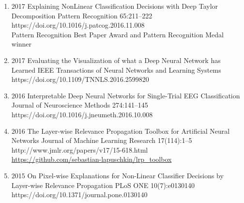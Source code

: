 {\begin{enumerate}
    \item {}
                            {2017}
                            {Explaining NonLinear Classification Decisions with Deep Taylor Decomposition}
                            {Pattern Recognition}
                            {65:211--222}
                            {https://doi.org/10.1016/j.patcog.2016.11.008}
                            {\\Pattern Recognition Best Paper Award and Pattern Recognition Medal winner}

    \item {}
                        {2017}
                        {Evaluating the Visualization of what a Deep Neural Network has Learned}
                        {IEEE Transactions of Neural Networks and Learning Systems}
                        {}
                        {https://doi.org/10.1109/TNNLS.2016.2599820}

    \item {}
                        {2016}
                        {Interpretable Deep Neural Networks for Single-Trial EEG Classification}
                        {Journal of Neuroscience Methods}
                        {274:141--145}
                        {https://doi.org/10.1016/j.jneumeth.2016.10.008}

    \item {}
                        {2016}
                        {The Layer-wise Relevance Propagation Toolbox for Artificial Neural Networks}
                        {Journal of Machine Learning Research}
                        {17(114):1--5}
                        {http://www.jmlr.org/papers/v17/15-618.html}
                        {\\\href{https://github.com/sebastian-lapuschkin/lrp_toolbox}{https://github.com/sebastian-lapuschkin/lrp\_toolbox}}

    \item {}
                        {2015}
                        {On Pixel-wise Explanations for Non-Linear Classifier Decisions by Layer-wise Relevance Propagation}
                        {PLoS ONE}
                        {10(7):e0130140}
                        {https://doi.org/10.1371/journal.pone.0130140}
\end{enumerate}
}
